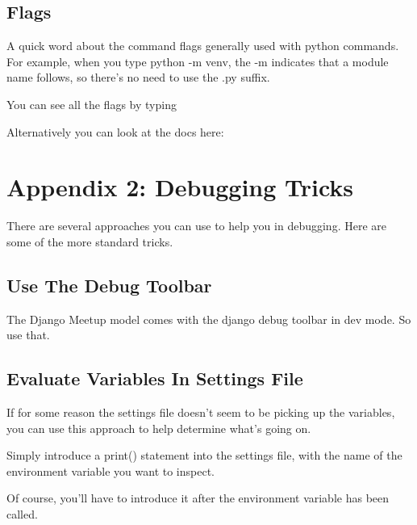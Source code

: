 \documentclass[letterpaper,10pt,english]{sphinxmanual}
\begin{document}
\subsection{Flags}
\label{\detokenize{guide/80_python:flags}}
A quick word about the command flags generally used with python commands.  For example, when you type python -m venv, the -m indicates that a module name follows, so there’s no need to use the .py suffix.

You can see all the flags by typing

\begin{sphinxVerbatim}[commandchars=\\\{\}]
 
\end{sphinxVerbatim}

Alternatively you can look at the docs here: 


\section{Appendix 2: Debugging Tricks}
\label{\detokenize{guide/81_debugging-tricks:appendix-2-debugging-tricks}}\label{\detokenize{guide/81_debugging-tricks::doc}}
There are several approaches you can use to help you in debugging.  Here are some of the more standard tricks.


\subsection{Use The Debug Toolbar}
\label{\detokenize{guide/81_debugging-tricks:use-the-debug-toolbar}}
The Django Meetup model comes with the django debug toolbar in dev mode.  So use that.


\subsection{Evaluate Variables In Settings File}
\label{\detokenize{guide/81_debugging-tricks:evaluate-variables-in-settings-file}}
If for some reason the settings file doesn’t seem to be picking up the variables, you can use this approach to help determine what’s going on.

Simply introduce a print() statement into the settings file, with the name of the environment variable you want to inspect.

Of course, you’ll have to introduce it after the environment variable has been called.
\end{document}
